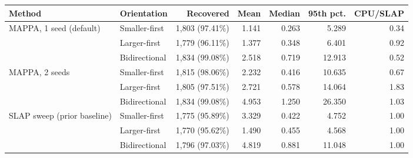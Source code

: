 \begin{tabular}{@{}llrrrrr@{}}\toprule
Method & Orientation & Recovered & Mean & Median & 95th pct. & CPU/SLAP\\\midrule
MAPPA, 1 seed (default) & Smaller-first & 1,803 (97.41\%) & 1.141 & 0.263 & 5.289 & 0.34\\
 & Larger-first & 1,779 (96.11\%) & 1.377 & 0.348 & 6.401 & 0.92\\
 & Bidirectional & 1,834 (99.08\%) & 2.518 & 0.719 & 12.913 & 0.52\\
\midrule
MAPPA, 2 seeds & Smaller-first & 1,815 (98.06\%) & 2.232 & 0.416 & 10.635 & 0.67\\
 & Larger-first & 1,805 (97.51\%) & 2.721 & 0.578 & 14.064 & 1.83\\
 & Bidirectional & 1,834 (99.08\%) & 4.953 & 1.250 & 26.350 & 1.03\\
\midrule
SLAP sweep (prior baseline) & Smaller-first & 1,775 (95.89\%) & 3.329 & 0.422 & 4.752 & 1.00\\
 & Larger-first & 1,770 (95.62\%) & 1.490 & 0.455 & 4.568 & 1.00\\
 & Bidirectional & 1,796 (97.03\%) & 4.819 & 0.881 & 11.048 & 1.00\\
\bottomrule\end{tabular}
